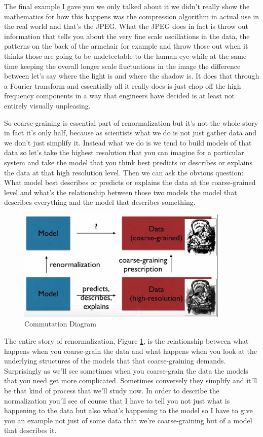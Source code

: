 \documentclass[]{article}
\begin{document}
The final example I gave you we only talked about
it we didn't really show the mathematics
for how this happens was the compression
algorithm in actual use in the real
world and that's the JPEG. What the JPEG
does in fact is throw out information
that tells you about the very
fine scale oscillations in the data, the
patterns on the back of the armchair for
example and throw those out when it
thinks those are going to be
undetectable to the human eye while at
the same time keeping the overall longer
scale fluctuations in the image the
difference between let's say where the
light is and where the shadow is. It does
that through a Fourier transform and
essentially all it really does is just
chop off the high frequency components
in a way that engineers have decided is
at least not entirely visually unpleasing.

 So coarse-graining is
essential part of renormalization but it's
not the whole story in fact it's only
half, because as scientists what we do is
not just gather data and we don't just
simplify it. Instead what we do is we
tend to build models of that data so
let's take the highest resolution that
you can imagine for a particular system
and take the model that you think best
predicts or describes or explains the
data at that high resolution level. Then
we can ask the obvious question: What
model best describes or predicts or
explains the data at the coarse-grained
level and what's the relationship
between those two models the model that
describes everything and the model that
describes something. 

\begin{figure}[H]
	\caption{Commutation Diagram}\label{fig:commutation}
	\includegraphics[width=0.9\textwidth]{commutation}
\end{figure}

The entire story of renormalization, Figure \ref{fig:commutation}, is the relationship between what happens when you coarse-grain the data and what happens
when you look at the underlying structures of the models that that
coarse-graining demands. Surprisingly as
we'll see sometimes when you coarse-grain the data the models that you need
get more complicated. Sometimes
conversely they simplify and it'll be
that kind of process that we'll study
now. In order to describe the
normalization you'll see of course that
I have to tell you not just what is
happening to the data but also what's
happening to the model so I have to give
you an example not just of some data
that we're coarse-graining but of a model
that describes it.
\end{document}

